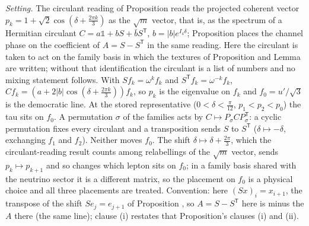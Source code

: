 \emph{Setting.} The circulant reading of Proposition  reads the projected coherent vector $p_{k} = 1 + \sqrt2\cos(\delta + \tfrac{2\pi k}{3})$ as the $\sqrt{m}$ vector, that is, as the spectrum of a Hermitian circulant $C = a\mathbb{1} + bS + \bar{b}S^{\mathsf{T}}$, $b = |b|e^{I_{4}\delta}$; Proposition  places the channel phase on the coefficient of $A = S - S^{\mathsf{T}}$ in the same reading. Here the circulant is taken to act on the family basis in which the textures of Proposition  and Lemma  are written; without that identification the circulant is a list of numbers and no mixing statement follows. With $Sf_{k} = \omega^{k}f_{k}$ and $S^{\mathsf{T}}f_{k} = \omega^{-k}f_{k}$, $Cf_{k} = (a + 2|b|\cos(\delta + \tfrac{2\pi k}{3}))f_{k}$, so $p_{k}$ is the eigenvalue on $f_{k}$ and $f_{0} = u'/\sqrt3$ is the democratic line. At the stored representative ($0 < \delta < \tfrac{\pi}{12}$, $p_{1} < p_{2} < p_{0}$) the tau sits on $f_{0}$. A permutation $\sigma$ of the families acts by $C \mapsto P_{\sigma}CP_{\sigma}^{\mathsf{T}}$: a cyclic permutation fixes every circulant and a transposition sends $S$ to $S^{\mathsf{T}}$ ($\delta \mapsto -\delta$, exchanging $f_{1}$ and $f_{2}$). Neither moves $f_{0}$. The shift $\delta \mapsto \delta + \tfrac{2\pi}{3}$, which the circulant-reading result counts among relabellings of the $\sqrt{m}$ vector, sends $p_{k} \mapsto p_{k+1}$ and so changes which lepton sits on $f_{0}$; in a family basis shared with the neutrino sector it is a different matrix, so the placement on $f_{0}$ is a physical choice and all three placements are treated. Convention: here $(Sx)_{i} = x_{i+1}$, the transpose of the shift $Se_{j} = e_{j+1}$ of Proposition , so $A = S - S^{\mathsf{T}}$ here is minus the $A$ there (the same line); clause (i) restates that Proposition's clauses (i) and (ii).


